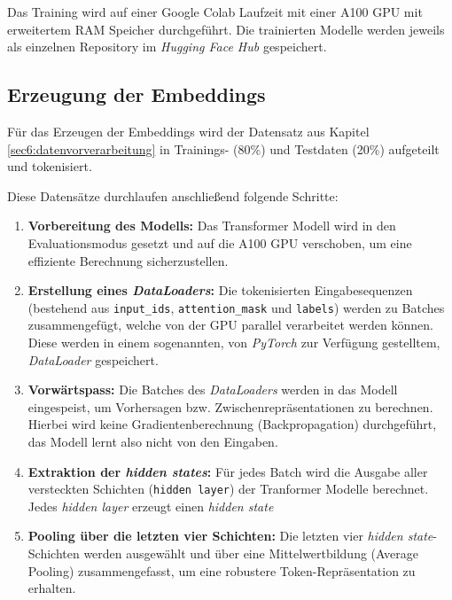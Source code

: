 Das Training wird auf einer Google Colab Laufzeit mit einer A100 GPU mit erweitertem RAM Speicher durchgeführt.
Die trainierten Modelle werden jeweils als einzelnen Repository im \textit{Hugging Face Hub} gespeichert.

\subsection{Erzeugung der Embeddings} \label{sec:erzeugung_der_embeddings}

Für das Erzeugen der Embeddings wird der Datensatz aus Kapitel \ref{sec6:datenvorverarbeitung} in Trainings- (80\%) und Testdaten (20\%) aufgeteilt und tokenisiert.

Diese Datensätze durchlaufen anschließend folgende Schritte: 

\begin{enumerate}
  \item \textbf{Vorbereitung des Modells:}  
  Das Transformer Modell wird in den Evaluationsmodus gesetzt und auf die A100 GPU verschoben, um eine effiziente Berechnung sicherzustellen.

  \item \textbf{Erstellung eines \textit{DataLoaders}:}  
    Die tokenisierten Eingabesequenzen (bestehend aus \texttt{input\_ids}, \texttt{attention\_mask} und \texttt{labels}) werden zu Batches zusammengefügt,
    welche von der GPU parallel verarbeitet werden können. Diese werden in einem sogenannten, von \textit{PyTorch} zur Verfügung gestelltem, \textit{DataLoader} gespeichert.

  \item \textbf{Vorwärtspass:}  
  Die Batches des \textit{DataLoaders} werden in das Modell eingespeist, um Vorhersagen bzw. Zwischenrepräsentationen zu berechnen.
  Hierbei wird keine Gradientenberechnung (Backpropagation) durchgeführt, das Modell lernt also nicht von den Eingaben.

  \item \textbf{Extraktion der \textit{hidden states}:}  
  Für jedes Batch wird die Ausgabe aller versteckten Schichten (\texttt{hidden layer}) der Tranformer Modelle berechnet. 
  Jedes \textit{hidden layer} erzeugt einen \textit{hidden state}

  \item \textbf{Pooling über die letzten vier Schichten:}  
  Die letzten vier \textit{hidden state}-Schichten werden ausgewählt und über eine Mittelwertbildung (Average Pooling) zusammengefasst, 
  um eine robustere Token-Repräsentation zu erhalten.


\end{enumerate}
